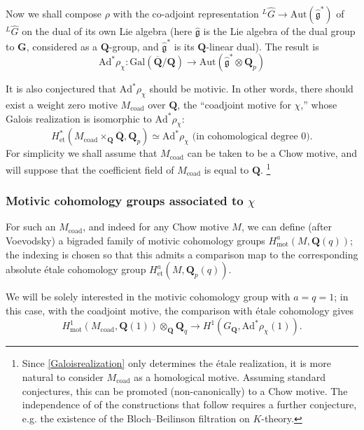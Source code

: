 \documentclass[10pt]{amsart}
\newcommand{\mot}{\mathrm{mot}}
\newcommand{\Gal}{\mathrm{Gal}}
\newcommand{\coad}{\mathrm{coad}}
\newcommand{\LG}{^{L}\hat{G}}
\newcommand{\Ad}{\mathrm{Ad}}
\newcommand{\Aut}{\mathrm{Aut}}
\newcommand{\Q}{\mathbf{Q}}
\newcommand{\G}{\mathbf{G}}
\theoremstyle{remark}
\begin{document}
  
Now we shall compose $\rho$ with the co-adjoint representation $\LG \rightarrow \Aut(\widehat{\mathfrak{g}}^*)$
of $\LG$ on the dual of its own Lie algebra (here $\widehat{\mathfrak{g}}$ is the  Lie algebra of the dual group to $\G$, considered as a $\Q$-group, 
and $\widehat{\mathfrak{g}}^*$ is its $\Q$-linear dual).
The result is  
$$  \Ad^* \rho_{\chi}: \Gal (\overline{\Q}/\Q) \longrightarrow \Aut(\widehat{\mathfrak{g}}^* \otimes \Q_{p})$$


It is also conjectured that  $\Ad^* \rho_{\chi}$ should be motivic.   In other words, there should exist a weight zero  motive   $M_{\coad}$ over $\Q$, the ``coadjoint motive for $\chi$,'' whose Galois realization
is isomorphic to $\Ad^* \rho_{\chi}$:
\begin{equation} \label{Galoisrealization} H^*_{\mathrm{et}}(M_{\coad} \times_{\Q} \overline{\Q}, \Q_{p}) \simeq \Ad^* \rho_{\chi} \mbox{ (in cohomological degree $0$)}.\end{equation}
For simplicity we shall assume that $M_{\coad}$ can be taken to be a Chow motive, and    will suppose that the coefficient field of $M_{\coad}$ is equal to $\Q$.   
\footnote{Since \eqref{Galoisrealization} only determines the {\'e}tale realization, it is more natural to consider $M_{\coad}$ as a homological motive. Assuming standard conjectures,
\cite[\S 7.3 Remark 3.bis]{murre}  this can be promoted (non-canonically) to a Chow motive.  The independence of 
of the constructions that follow requires a further conjecture, e.g. the existence of the Bloch--Beilinson filtration on $K$-theory.}
 \medskip

 

\subsubsection{Motivic cohomology groups associated to $\chi$} \label{motivic chi} 
For such an $M_{\coad}$, and indeed for any Chow motive $M$, we can define (after Voevodsky) a bigraded family of motivic cohomology groups  $H^{a}_{\mot}(M ,\Q(q))$; the indexing is chosen so that this  admits a comparison map to the corresponding absolute {\'e}tale cohomology group $H^a_{\mathrm{et}}(M, \Q_p(q))$. 



We will be solely interested in the motivic cohomology group with $a=q=1$; 
in this case, with the coadjoint motive,  the comparison with {\'e}tale cohomology gives
\begin{equation} \label{saxophone} H^1_{\mot}(M_{\coad}, \Q(1))  \otimes_{\Q} \Q_q \rightarrow H^1(G_{\Q}, \Ad^* \rho_{\chi}(1)).\end{equation}
\end{document}
